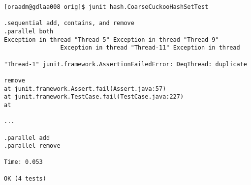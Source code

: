 \begin{verbatim}
[oraadm@gdlaa008 orig]$ junit hash.CoarseCuckooHashSetTest

.sequential add, contains, and remove
.parallel both
Exception in thread "Thread-5" Exception in thread "Thread-9"
                Exception in thread "Thread-11" Exception in thread
                
"Thread-1" junit.framework.AssertionFailedError: DeqThread: duplicate
                
remove
at junit.framework.Assert.fail(Assert.java:57)
at junit.framework.TestCase.fail(TestCase.java:227)
at
                
...
                
.parallel add
.parallel remove

Time: 0.053

OK (4 tests)
\end{verbatim}
\hfill

